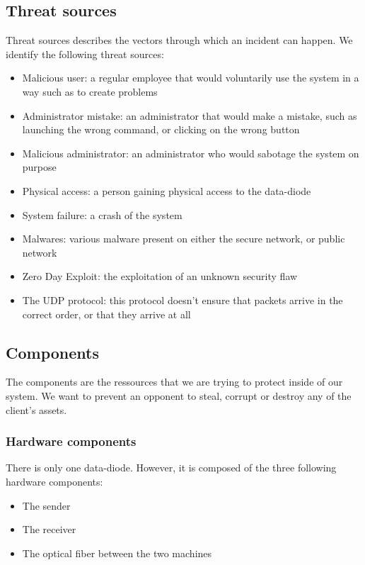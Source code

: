 \documentclass[a4paper,11pt]{article}
\begin{document}
\subsection{Threat sources}
Threat sources describes the vectors through which an incident can happen. We identify the following threat sources:\\
\begin{itemize}
\item Malicious user: a regular employee that would voluntarily use the system in a way such as to create problems 
\item Administrator mistake: an administrator that would make a mistake, such as launching the wrong command, or clicking on the wrong button
\item Malicious administrator: an administrator who would sabotage the system on purpose
\item Physical access: a person gaining physical access to the data-diode
\item System failure: a crash of the system
\item Malwares: various malware present on either the secure network, or public network
\item Zero Day Exploit: the exploitation of an unknown security flaw
\item The UDP protocol: this protocol doesn't ensure that packets arrive in the correct order, or that they arrive at all
\end{itemize}
\subsection{Components}
The components are the ressources that we are trying to protect inside of our system. We want to prevent an opponent to steal, corrupt or destroy any of the client's assets.
\subsubsection{Hardware components}
There is only one data-diode. However, it is composed of the three following hardware components:

\begin{itemize}
\item The sender
\item The receiver
\item The optical fiber between the two machines
\end{itemize}
\end{document}
